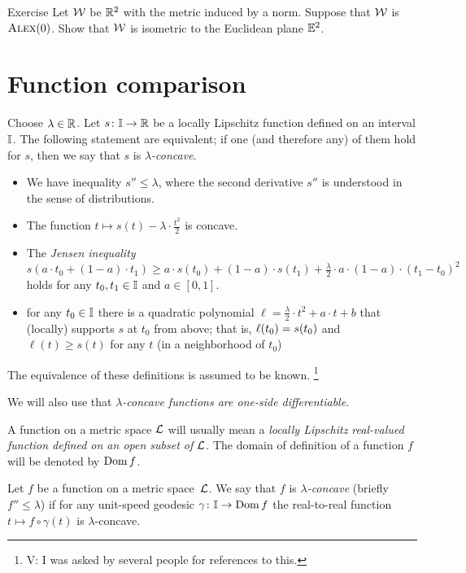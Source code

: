 \begin{thm}{Exercise}\label{ex:normCBB}
Let $\mathcal{W}$ be $\mathbb{R}^2$ with the metric induced by a norm.
Suppose that $\mathcal{W}$ is $\textsc{Alex}(0)$.
Show that $\mathcal{W}$ is isometric to the Euclidean plane $\mathbb{E}^2$.
\end{thm}

\section{Function comparison}\label{Function comparison}

Choose $\lambda\in \mathbb{R}$.
Let $s\colon\mathbb{I}\to\mathbb{R}$ be a locally Lipschitz function defined on an interval $\mathbb{I}$.
The following statement are equivalent;
if one (and therefore any) of them hold for $s$, then we say that $s$ is \emph{$\lambda$-concave}.
\begin{itemize}
\item We have inequality $s''\le \lambda$, where the second derivative $s''$ is understood in the sense of distributions.
\item The function $t\mapsto s(t)-\lambda\cdot\tfrac{t^2}2$ is concave.
\item The \emph{Jensen inequality}
\[s(a\cdot t_0+(1-a)\cdot t_1)\ge a\cdot s(t_0)+(1-a)\cdot s(t_1)+\tfrac\lambda2\cdot a\cdot(1-a)\cdot(t_1-t_0)^2 \]
holds for any $t_0,t_1\in \mathbb{I}$ and $a\in[0,1]$.
\item for any $t_0\in \mathbb{I}$ there is a quadratic polynomial $\ell=\tfrac\lambda2\cdot t^2+a\cdot t+b$ that (locally) supports $s$ at $t_0$ from above;
that is, $\ell(t_0)\z= s(t_0)$ and $\ell(t)\ge s(t)$ for any $t$ (in a neighborhood of $t_0$)
\end{itemize}

The equivalence of these definitions is assumed to be known.
\footnote{\red V: I was asked by several people for references to this. }

We will also use that \textit{$\lambda$-concave functions are one-side differentiable}.

A function on a metric space $\mathcal{L}$ will usually mean a \textit{locally Lipschitz real-valued function defined on an open subset of $\mathcal{L}$}.
The domain of definition of a function $f$ will be denoted by $\mathop{\rm Dom}\nolimits f$.

Let $f$ be a function on a metric space~$\mathcal{L}$.
We say that $f$ is \emph{$\lambda$-concave} (briefly $f''\le \lambda$) if 
for any unit-speed geodesic $\gamma\:\II\z\to \Dom f$
the real-to-real function $t\mapsto f\circ\gamma(t)$ is $\lambda$-concave.

